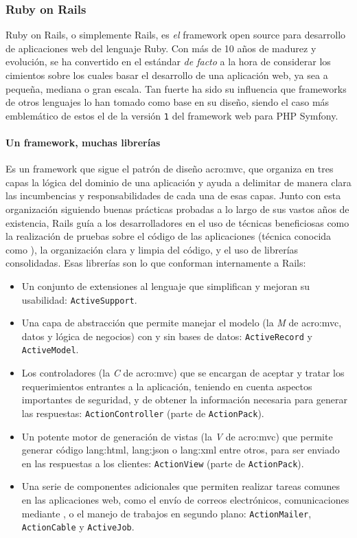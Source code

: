 \subsubsection{Ruby on Rails}
\label{soa:tecnologias:rails}

Ruby on Rails, o simplemente Rails, es \textit{el} framework open source para desarrollo de aplicaciones web del lenguaje Ruby. Con más de 10 años de madurez y evolución, se ha convertido en el estándar \textit{de facto} a la hora de considerar los cimientos sobre los cuales basar el desarrollo de una aplicación web, ya sea a pequeña, mediana o gran escala. Tan fuerte ha sido su influencia que frameworks de otros lenguajes lo han tomado como base en su diseño, siendo el caso más emblemático de estos el de la versión \texttt{1} del framework web para PHP Symfony.

\paragraph{Un framework, muchas librerías}

Es un framework que sigue el patrón de diseño \gls{acro:mvc}, que organiza en tres capas la lógica del dominio de una aplicación y ayuda a delimitar de manera clara las incumbencias y responsabilidades de cada una de esas capas. Junto con esta organización siguiendo buenas prácticas probadas a lo largo de sus vastos años de existencia, Rails guía a los desarrolladores en el uso de técnicas beneficiosas como la realización de pruebas sobre el código de las aplicaciones (técnica conocida como ), la organización clara y limpia del código, y el uso de librerías consolidadas. Esas librerías son lo que conforman internamente a Rails:

\begin{itemize}
  \item Un conjunto de extensiones al lenguaje que simplifican y mejoran su usabilidad: \texttt{ActiveSupport}.
  \item Una capa de abstracción que permite manejar el modelo (la \textit{M} de \gls{acro:mvc}, datos y lógica de negocios) con y sin bases de datos: \texttt{ActiveRecord} y \texttt{ActiveModel}.
  \item Los controladores (la \textit{C} de \gls{acro:mvc}) que se encargan de aceptar y tratar los requerimientos entrantes a la aplicación, teniendo en cuenta aspectos importantes de seguridad, y de obtener la información necesaria para generar las respuestas: \texttt{ActionController} (parte de \texttt{ActionPack}).
  \item Un potente motor de generación de vistas (la \textit{V} de \gls{acro:mvc}) que permite generar código \gls{lang:html}, \gls{lang:json} o \gls{lang:xml} entre otros, para ser enviado en las respuestas a los clientes: \texttt{ActionView} (parte de \texttt{ActionPack}).
  \item Una serie de componentes adicionales que permiten realizar tareas comunes en las aplicaciones web, como el envío de correos electrónicos, comunicaciones mediante , o el manejo de trabajos en segundo plano: \texttt{ActionMailer}, \texttt{ActionCable} y \texttt{ActiveJob}.
\end{itemize}


